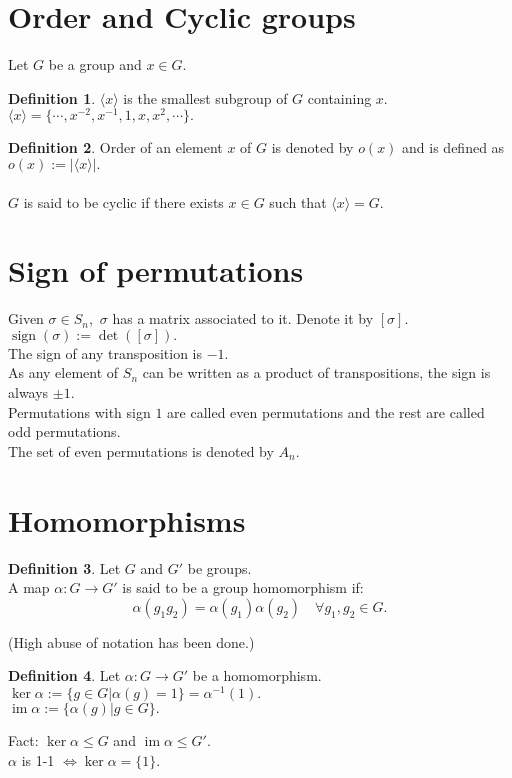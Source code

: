 \documentclass[12 pt, a4paper, toc=graduated, oneside]{article}
\theoremstyle{definition}
\newtheorem{defn}{Definition}
\newcommand{\im}{\operatorname{im}}
\begin{document}
\section{Order and Cyclic groups}
Let $G$ be a group and $x \in G.$\\
\begin{defn}
	$\langle x\rangle$ is the smallest subgroup of $G$ containing $x.$\\
	$\langle x\rangle = \{\cdots, x^{-2}, x^{-1}, 1, x, x^2, \cdots\}.$\\
\end{defn}
\begin{defn}
	Order of an element $x$ of $G$ is denoted by $o(x)$ and is defined as $o(x) := |\langle x\rangle|.$\\~\\
	$G$ is said to be cyclic if there exists $x \in G$ such that $\langle x\rangle = G.$
\end{defn}

\section{Sign of permutations}
Given $\sigma \in S_n,$ $\sigma$ has a matrix associated to it. Denote it by $[\sigma].$\\
$\operatorname{sign}(\sigma) := \det([\sigma]).$\\
The sign of any transposition is $-1.$\\
As any element of $S_n$ can be written as a product of transpositions, the sign is always $\pm 1.$\\
Permutations with sign $1$ are called even permutations and the rest are called odd permutations.\\
The set of even permutations is denoted by $A_n.$

\section{Homomorphisms}
\begin{defn}
	Let $G$ and $G'$ be groups.\\
	A map $\alpha:G\to G'$ is said to be a group homomorphism if:
	\[\alpha(g_1g_2) = \alpha(g_1)\alpha(g_2) \quad \forall g_1, g_2 \in G.\]
\end{defn}
(High abuse of notation has been done.)

\begin{defn}
	Let $\alpha : G \to G'$ be a homomorphism.\\
	$\ker \alpha := \{g \in G | \alpha(g) = 1\} = \alpha^{-1}(1).$\\
	$\im \alpha := \{\alpha(g) | g \in G\}.$
\end{defn}
Fact: $\ker \alpha \le G$ and $\im \alpha \le G'.$\\
$\alpha$ is 1-1 $\iff \ker \alpha = \{1\}.$ 
\end{document}
